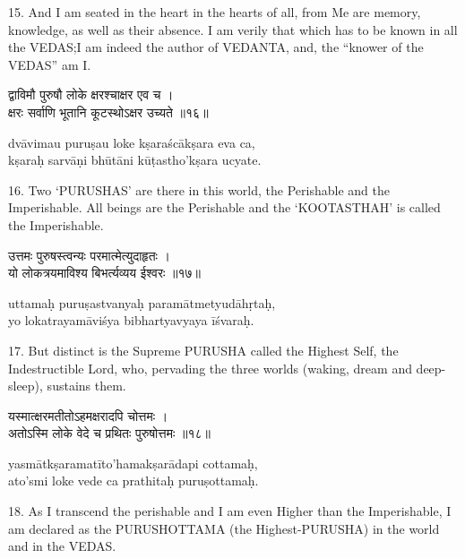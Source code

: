 15. And I am seated in the heart in the hearts of all, from Me are memory,
knowledge, as well as their absence. I am verily that which has to be known in
all the VEDAS;\@ I am indeed the author of VEDANTA, and, the ``knower of the
VEDAS'' am I.\@

\begin{gitaverse}
द्वाविमौ पुरुषौ लोके क्षरश्चाक्षर एव च । \\
क्षरः सर्वाणि भूतानि कूटस्थोऽक्षर उच्यते ॥१६॥
\end{gitaverse}

\begin{transliteration}
dvāvimau puruṣau loke kṣaraścākṣara eva ca, \\
kṣaraḥ sarvāṇi bhūtāni kūṭastho'kṣara ucyate.
\end{transliteration}

16. Two `PURUSHAS' are there in this world, the Perishable and the
Imperishable. All beings are the Perishable and the `KOOTASTHAH' is called the
Imperishable.

\begin{gitaverse}
उत्तमः पुरुषस्त्वन्यः परमात्मेत्युदाहृतः । \\
यो लोकत्रयमाविश्य बिभर्त्यव्यय ईश्वरः ॥१७॥
\end{gitaverse}

\begin{transliteration}
uttamaḥ puruṣastvanyaḥ paramātmetyudāhṛtaḥ, \\
yo lokatrayamāviśya bibhartyavyaya īśvaraḥ.
\end{transliteration}

17. But distinct is the Supreme PURUSHA called the Highest Self, the
Indestructible Lord, who, pervading the three worlds (waking, dream and
deep-sleep), sustains them.

\begin{gitaverse}
यस्मात्क्षरमतीतोऽहमक्षरादपि चोत्तमः । \\
अतोऽस्मि लोके वेदे च प्रथितः पुरुषोत्तमः ॥१८॥
\end{gitaverse}

\begin{transliteration}
yasmātkṣaramatīto'hamakṣarādapi cottamaḥ, \\
ato'smi loke vede ca prathitaḥ puruṣottamaḥ.
\end{transliteration}

18. As I transcend the perishable and I am even Higher than the Imperishable, I
am declared as the PURUSHOTTAMA (the Highest-PURUSHA) in the world and in the
VEDAS.\@

